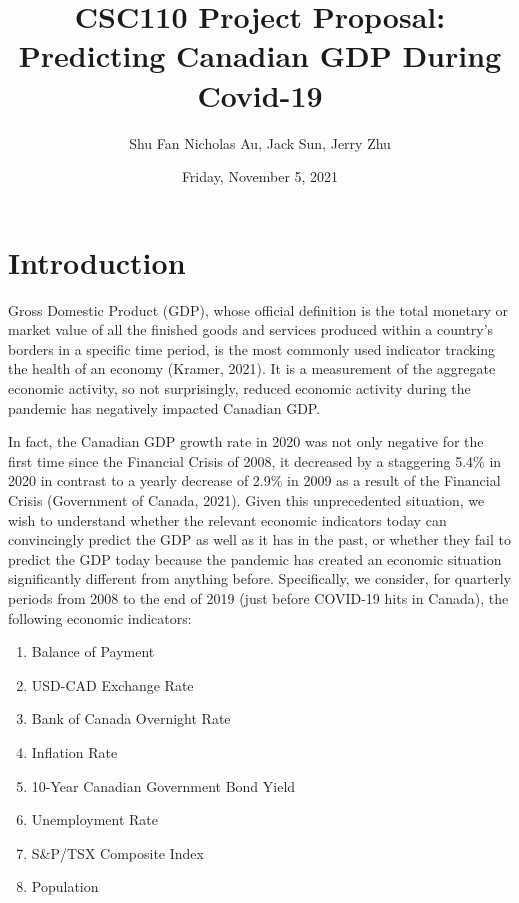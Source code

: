\documentclass{article}
\title{CSC110 Project Proposal: Predicting Canadian GDP During Covid-19}
\author{Shu Fan Nicholas Au, Jack Sun, Jerry Zhu}
\date{Friday, November 5, 2021}
\begin{document}
  
\maketitle  
  
\section{Introduction}  
Gross Domestic Product (GDP), whose official definition is the total monetary or market value of all the finished goods and services produced within a country’s borders in a specific time period, is the most commonly used indicator tracking the health of an economy (Kramer, 2021). It is a measurement of the aggregate economic activity, so not surprisingly, reduced economic activity during the pandemic has negatively impacted Canadian GDP. 

In fact, the Canadian GDP growth rate in 2020 was not only negative for the first time since the Financial Crisis of 2008, it decreased by a staggering 5.4\% in 2020 in contrast to a yearly decrease of 2.9\% in 2009 as a result of the Financial Crisis (Government of Canada, 2021). Given this unprecedented situation, we wish to understand whether the relevant economic indicators today can convincingly predict the GDP as well as it has in the past, or whether they fail to predict the GDP today because the pandemic has created an economic situation significantly different from anything before. Specifically, we consider, for quarterly periods from 2008 to the end of 2019 (just before COVID-19 hits in Canada), the following economic indicators:	 
  
\begin{enumerate}[topsep=0pt]  
  \itemsep0em  
  \item Balance of Payment  
  \item USD-CAD Exchange Rate  
  \item Bank of Canada Overnight Rate  
  \item Inflation Rate  
  \item 10-Year Canadian Government Bond Yield  
  \item Unemployment Rate  
  \item S\&P/TSX Composite Index  
  \item Population  
\end{enumerate}  
  
\end{document}
